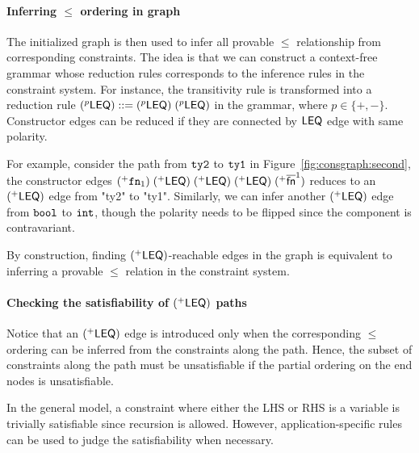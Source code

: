 \paragraph{Inferring $\leq$ ordering in graph}

The initialized graph is then used to infer all provable $\leq$
relationship from corresponding constraints.
%
The idea is that we can construct a context-free grammar whose reduction
rules corresponds to the inference rules in the constraint system. For
instance, the transitivity rule is transformed into a reduction rule
$(^{p}\mathsf{LEQ}) ::= (^{p}\mathsf{LEQ})\; (^{p}\mathsf{LEQ})$ in
the grammar, where $p\in \{+,-\}$. Constructor edges can be reduced
if they are connected by $\mathsf{LEQ}$ edge with same polarity.

For example, consider the path from $\mathtt{ty2}$ to $\mathtt{ty1}$ in
Figure~\ref{fig:consgraph:second}, the constructor edges
$(^{+}\mathtt{fn}_1)\; (^{+}\mathsf{LEQ})\; (^{+}\mathsf{LEQ})\;
(^{+}\mathsf{LEQ})\; (^{+}\overline{\textsf{fn}}^{1})$ reduces to an
$(^{+}\mathsf{LEQ})$ edge from "ty2" to "ty1".
Similarly, we can infer another $(^{+}\mathsf{LEQ})$ edge from
$\mathtt{bool}$ to $\mathtt{int}$, though the polarity needs to be flipped
since the component is contravariant.

By construction, finding $(^{+}\mathsf{LEQ})$-reachable edges in the
graph is equivalent to inferring a provable $\leq$ relation in the
constraint system.

\paragraph{Checking the satisfiability of $(^{+}\mathsf{LEQ})$ paths}

Notice that an $(^{+}\mathsf{LEQ})$ edge is introduced only when the
corresponding $\leq$ ordering can be inferred from the constraints
along the path. Hence, the subset of constraints along the path must
be unsatisfiable if the partial ordering on the end nodes is
unsatisfiable.

In the general model, a constraint where either the LHS or RHS is a
variable is trivially satisfiable since recursion is allowed. However,
application-specific rules can be used to judge the satisfiability
when necessary.

